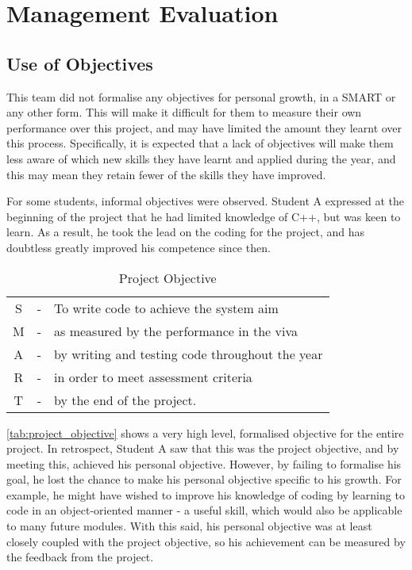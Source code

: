 


\section{Management Evaluation}\label{sec:management}
    \subsection{Use of Objectives}\label{subsec:management-objectives}
        This team did not formalise any objectives for personal growth, in a SMART or any other form.
        This will make it difficult for them to measure their own performance over this project, and may have limited the amount they learnt over this process.
        Specifically, it is expected that a lack of objectives will make them less aware of which new skills they have learnt and applied during the year, and this may mean they retain fewer of the skills they have improved.

        For some students, informal objectives were observed.
        Student A expressed at the beginning of the project that he had limited knowledge of C++, but was keen to learn.
        As a result, he took the lead on the coding for the project, and has doubtless greatly improved his competence since then.
        \begin{table}
            \centering
            \caption{Project Objective}
            \label{tab:project_objective}
            \begin{tabular}{ccl}
                S & - & To write code to achieve the system aim         \\
                M & - & as measured by the performance in the viva      \\
                A & - & by writing and testing code throughout the year \\
                R & - & in order to meet assessment criteria            \\
                T & - & by the end of the project.
            \end{tabular}
        \end{table} %

        \autoref{tab:project_objective} shows a very high level, formalised objective for the entire project.
        In retrospect, Student A saw that this was the project objective, and by meeting this, achieved his personal objective.
        However, by failing to formalise his goal, he lost the chance to make his personal objective specific to his growth.
        For example, he might have wished to improve his knowledge of coding by learning to code in an object-oriented manner - a useful skill, which would also be applicable to many future modules.
        With this said, his personal objective was at least closely coupled with the project objective, so his achievement can be measured by the feedback from the project.

